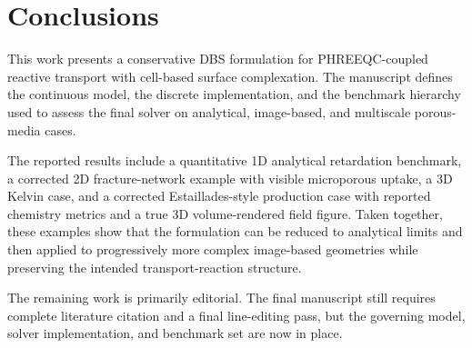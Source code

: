 \section{Conclusions}

This work presents a conservative DBS formulation for PHREEQC-coupled reactive
transport with cell-based surface complexation. The manuscript defines the
continuous model, the discrete implementation, and the benchmark hierarchy
used to assess the final solver on analytical, image-based, and multiscale
porous-media cases.

The reported results include a quantitative 1D analytical retardation
benchmark, a corrected 2D fracture-network example with visible microporous
uptake, a 3D Kelvin case, and a corrected Estaillades-style production case
with reported chemistry metrics and a true 3D volume-rendered field figure.
Taken together, these examples show that the formulation can be reduced to
analytical limits and then applied to progressively more complex image-based
geometries while preserving the intended transport-reaction structure.

The remaining work is primarily editorial. The final manuscript still requires
complete literature citation and a final line-editing pass, but the governing
model, solver implementation, and benchmark set are now in place.
